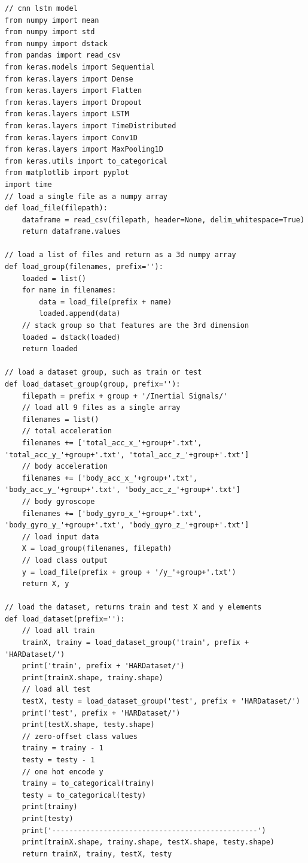 \begin{lstlisting}
// cnn lstm model
from numpy import mean
from numpy import std
from numpy import dstack
from pandas import read_csv
from keras.models import Sequential
from keras.layers import Dense
from keras.layers import Flatten
from keras.layers import Dropout
from keras.layers import LSTM
from keras.layers import TimeDistributed
from keras.layers import Conv1D
from keras.layers import MaxPooling1D
from keras.utils import to_categorical
from matplotlib import pyplot
import time
// load a single file as a numpy array
def load_file(filepath):
	dataframe = read_csv(filepath, header=None, delim_whitespace=True)
	return dataframe.values

// load a list of files and return as a 3d numpy array
def load_group(filenames, prefix=''):
	loaded = list()
	for name in filenames:
		data = load_file(prefix + name)
		loaded.append(data)
	// stack group so that features are the 3rd dimension
	loaded = dstack(loaded)
	return loaded

// load a dataset group, such as train or test
def load_dataset_group(group, prefix=''):
	filepath = prefix + group + '/Inertial Signals/'
	// load all 9 files as a single array
	filenames = list()
	// total acceleration
	filenames += ['total_acc_x_'+group+'.txt', 'total_acc_y_'+group+'.txt', 'total_acc_z_'+group+'.txt']
	// body acceleration
	filenames += ['body_acc_x_'+group+'.txt', 'body_acc_y_'+group+'.txt', 'body_acc_z_'+group+'.txt']
	// body gyroscope
	filenames += ['body_gyro_x_'+group+'.txt', 'body_gyro_y_'+group+'.txt', 'body_gyro_z_'+group+'.txt']
	// load input data
	X = load_group(filenames, filepath)
	// load class output
	y = load_file(prefix + group + '/y_'+group+'.txt')
	return X, y

// load the dataset, returns train and test X and y elements
def load_dataset(prefix=''):
	// load all train
	trainX, trainy = load_dataset_group('train', prefix + 'HARDataset/')
	print('train', prefix + 'HARDataset/')
	print(trainX.shape, trainy.shape)
	// load all test
	testX, testy = load_dataset_group('test', prefix + 'HARDataset/')
	print('test', prefix + 'HARDataset/')
	print(testX.shape, testy.shape)
	// zero-offset class values
	trainy = trainy - 1
	testy = testy - 1
	// one hot encode y
	trainy = to_categorical(trainy)
	testy = to_categorical(testy)
	print(trainy)
	print(testy)
	print('------------------------------------------------')
	print(trainX.shape, trainy.shape, testX.shape, testy.shape)
	return trainX, trainy, testX, testy


\end{lstlisting}
